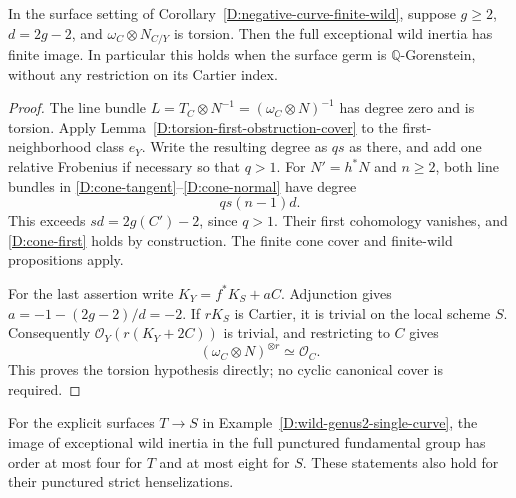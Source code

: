 \begin{corollary}
\label{D:negative-curve-equality-finite-wild}
In the surface setting of
Corollary~\ref{D:negative-curve-finite-wild}, suppose $g\geq2$,
$d=2g-2$, and $\omega_C\otimes N_{C/Y}$ is torsion.
Then the full exceptional wild inertia has finite image.
In particular this holds when the surface germ is
$\mathbb Q$-Gorenstein, without any restriction on its
Cartier index.
\end{corollary}

\begin{proof}
The line bundle
$L=T_C\otimes N^{-1}=(\omega_C\otimes N)^{-1}$
has degree zero and is torsion.  Apply
Lemma~\ref{D:torsion-first-obstruction-cover} to the
first-neighborhood class $e_Y$.  Write the resulting
degree as $qs$ as there, and add one relative Frobenius
if necessary so that $q>1$.
For $N'=h^*N$ and $n\geq2$, both line bundles in
\eqref{D:cone-tangent}--\eqref{D:cone-normal} have degree
\[
                 qs(n-1)d.
\]
This exceeds $sd=2g(C')-2$, since $q>1$.
Their first cohomology vanishes, and
\eqref{D:cone-first} holds by construction.
The finite cone cover and finite-wild propositions apply.

For the last assertion write
$K_Y=f^*K_S+aC$.  Adjunction gives
$a=-1-(2g-2)/d=-2$.
If $rK_S$ is Cartier, it is trivial on the local scheme
$S$.  Consequently $\mathcal O_Y(r(K_Y+2C))$ is
trivial, and restricting to $C$ gives
\[
                    (\omega_C\otimes N)^{\otimes r}
                         \simeq\mathcal O_C.
\]
This proves the torsion hypothesis directly; no cyclic
canonical cover is required.
\end{proof}

\begin{corollary}
\label{D:wild-genus2-finite-inertia}
For the explicit surfaces $T\to S$ in
Example~\ref{D:wild-genus2-single-curve}, the image of
exceptional wild inertia in the full punctured
fundamental group has order at most four for $T$ and
at most eight for $S$.  These statements also hold for
their punctured strict henselizations.
\end{corollary}

